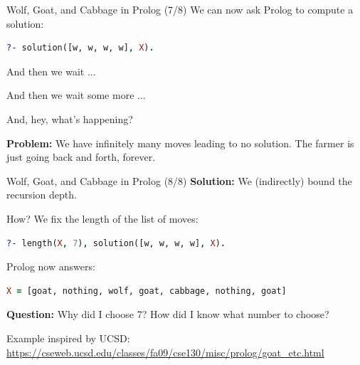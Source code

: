 \begin{frame}[fragile]{Wolf, Goat, and Cabbage in Prolog (7/8)}
We can now ask Prolog to compute a solution:

\begin{lstlisting}[language=prolog, xleftmargin=0.5cm]
?- solution([w, w, w, w], X).
\end{lstlisting}

\pause 

And then we wait ...

\pause 

And then we wait some more ...

\pause 

And, hey, what's happening?

\pause 

\textbf{Problem:} We have infinitely many moves leading to no solution. The
farmer is just going back and forth, forever. 
\end{frame}

\begin{frame}[fragile]{Wolf, Goat, and Cabbage in Prolog (8/8)}
\textbf{Solution:} We (indirectly) bound the recursion depth.

\pause

How? We fix the length of the list of moves:

\begin{lstlisting}[language=prolog, xleftmargin=0.5cm]
?- length(X, 7), solution([w, w, w, w], X).
\end{lstlisting}

\pause

Prolog now answers:

\begin{lstlisting}[language=prolog, xleftmargin=0.5cm]
X = [goat, nothing, wolf, goat, cabbage, nothing, goat]
\end{lstlisting}

\pause

\textbf{Question:} Why did I choose 7? How did I know what number to choose?

\pause

\bigskip 
\scriptsize
Example inspired by UCSD: {\tiny \url{https://cseweb.ucsd.edu/classes/fa09/cse130/misc/prolog/goat_etc.html}}
\end{frame}

